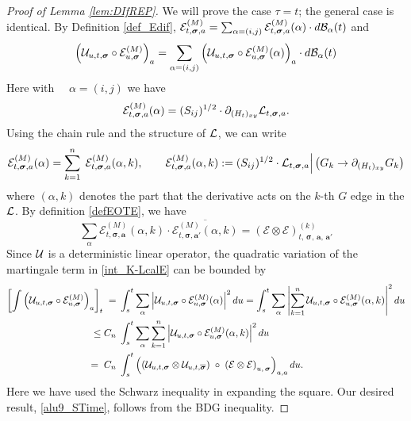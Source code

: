 \documentclass[10pt,reqno]{article}
\theoremstyle{plain} %
\theoremstyle{remark}
\numberwithin{equation}{section}
\begin{document}
\begin{proof}[Proof of Lemma \ref{lem:DIfREP}]


 

We will prove the case $\tau =t$; the general case is identical. 
By Definition \ref{def_Edif}, $
 \mathcal{E}^{(M)}_{t, \boldsymbol{\sigma}, \textbf{a}}=\sum_{\alpha=(i,j)} \mathcal{E}^{(M)}_{t, \boldsymbol{\sigma}, \textbf{a}}(\alpha)\cdot d{\cal B}_\alpha(t) $ 
 and 
 $$
 \left(\mathcal{U}_{u, t, \boldsymbol{\sigma}}\circ \mathcal{E}^{(M)}_{u, \boldsymbol{\sigma}}\right)_{\textbf{a}}=
 \sum_{\alpha=(i,j)}
 \left(
 \mathcal{U}_{u, t, \boldsymbol{\sigma}} \circ\mathcal{E}^{(M)}_{u, \boldsymbol{\sigma}}
 (\alpha)
 \right)_{\textbf{a}}\cdot d{\cal B}_\alpha(t)
 $$
Here with $\quad \alpha=(i,j)$ we have 
$$
\mathcal{E}^{(M)}_{t, \boldsymbol{\sigma},\textbf{a}}
 (\alpha)
 =(S_{ij})^{1/2}\cdot \partial_{(H_t)_{xy}} {\cal L}_{t,\boldsymbol{\sigma},\textbf{a}}.
$$
Using  the chain rule and the structure of $\cal L$, we can write 
 $$
\mathcal{E}^{(M)}_{t, \boldsymbol{\sigma},\textbf{a}}
 (\alpha)=\sum_{k=1}^{n}\;\mathcal{E}^{(M)}_{t, \boldsymbol{\sigma},\textbf{a}}
 (\alpha, k), \quad \quad \mathcal{E}^{(M)}_{t, \boldsymbol{\sigma},\textbf{a}}
 (\alpha, k):=(S_{ij})^{1/2}\cdot  {\cal L}_{t,\boldsymbol{\sigma},\textbf{a}}\Big|\left(G_k\to \partial_{(H_t)_{xy}}G_k\right)$$
 where $ (\alpha, k)$ denotes  the part that  the derivative acts on the $k$-th $G$ edge in the $\cal L$.  By definition  \eqref{defEOTE},  we have 
 $$
 \sum_\alpha   \mathcal{E}^{(M)}_{t, \boldsymbol{\sigma},\textbf{a}}
 (\alpha, k)\cdot \overline {\mathcal{E}^{(M)}_{t, \boldsymbol{\sigma},\textbf{a}'}(\alpha, k)}=
 \left(\mathcal{E}\otimes  \mathcal{E}\right)^{(k)}_{t, \,\boldsymbol{\sigma}, \,\textbf{a},\,\textbf{a}'}
 $$
 Since  $\cal U$ is a deterministic linear operator,   the  quadratic  variation of the martingale  term in \eqref{int_K-LcalE}
 can be bounded by 
 \begin{align} \label{UEUEdif}
  \left[\int \left(\mathcal{U}_{u, t, \boldsymbol{\sigma}} \circ \mathcal{E}^{(M)}_{u, \boldsymbol{\sigma}}\right)_{\textbf{a}} \right ]_t
\;=\; & \int_s^t
\sum_{\alpha}\left|  \mathcal{U}_{u, t, \boldsymbol{\sigma}} \circ\mathcal{E}^{(M)}_{u, \boldsymbol{\sigma}}(\alpha )
 \right|^2 du 
 = \int_s^t
\sum_{\alpha}\left|\sum_{k=1}^n \mathcal{U}_{u, t, \boldsymbol{\sigma}} \circ\mathcal{E}^{(M)}_{u, \boldsymbol{\sigma}}(\alpha, k)
 \right|^2 du
 \nonumber \\
\; \;\le C_n\; &\int_s^t
\sum_{\alpha}\sum_{k=1}^n\left| \mathcal{U}_{u, t, \boldsymbol{\sigma}} \circ\mathcal{E}^{(M)}_{u, \boldsymbol{\sigma}}(\alpha, k)
 \right|^2 du
\nonumber \\
\;=\;C_n \; &\int_{s}^t
\left(\left(
   \mathcal{U}_{u, t,  \boldsymbol{\sigma}}
   \otimes 
   \mathcal{U}_{u, t,  \overline{\boldsymbol{\sigma}}}
   \right) \;\circ  \;
   \left( \mathcal{E} \otimes  \mathcal{E} \right)
   _{u, \,\boldsymbol{\sigma}  }
   \right)_{{\textbf a}, {\textbf a}} du.
\end{align}
Here we have used the Schwarz inequality in expanding the square. 
Our desired result,  \eqref{alu9_STime}, follows from the BDG inequality.
  
 
    
\end{proof}
\end{document}
